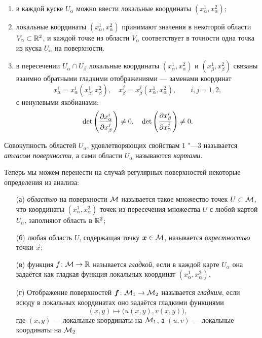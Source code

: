 \begin{enumerate}[nolistsep, label=(\arabic*)]
	\item в каждой куске $U_\alpha$ можно ввести локальные координаты $(x^1_\alpha, x^2_\alpha)$;
	\item локальные координаты $(x^1_\alpha, x^2_\alpha)$ принимают значения в некоторой области $V_\alpha \subset \mathbb{R}^2$, и каждой точке из области $V_\alpha$ соответствует в точности одна точка из куска $U_\alpha$ на поверхности.
	\item в пересечении $U_\alpha \cap U_\beta$ локальные координаты $(x^1_\alpha, x^2_\alpha)$ и $(x^1_\beta, x^2_\beta)$ связаны взаимно обратными гладкими отображениями --- заменами координат
		\[
			x^i_\alpha = x^i_\alpha(x^1_\beta, x^2_\beta),\quad x^j_\beta = x^j_\beta(x^1_\alpha, x^2_\alpha),\qquad i, j = 1, 2,
		\]
		с ненулевыми якобианами:
		\[
			\det\left(\frac{\partial x^i_\alpha}{\partial x^j_\beta}\right) \ne 0,\quad \det\left(\frac{\partial x^i_\beta}{\partial x^j_\alpha}\right) \ne 0.
		\]
\end{enumerate}

\begin{definition}
	Совокупность областей $U_\alpha$, удовлетворяющих свойствам $1$ "---$3$ называется \textit{атласом поверхности}, а сами области $U_\alpha$ называются \textit{картами}.
\end{definition}

Теперь мы можем перенести на случай регулярных поверхностей некоторые определения из анализа:

\begin{enumerate}[nolistsep]
	\item[(а)] \textit{областью} на поверхности $\mathcal{M}$ называется такое множество точек $U \subset \mathcal{M}$, что координаты $(x_\alpha^1, x_\alpha^2)$ точек из пересечения множества $U$ с любой картой $U_\alpha$, заполняют область в $\mathbb{R}^2$;
	\item[(б)] любая область $U$, содержащая точку $\boldsymbol{x} \in \mathcal{M}$, называется \textit{окрестностью} точки $\vec{x}$;
	\item[(в)] функция $f\colon \mathcal{M} \to \mathbb{R}$ называется \textit{гладкой}, если в каждой карте $U_\alpha$ она задаётся как гладкая функция локальных координат $(x_\alpha^1, x_\alpha^2)$.
	\item[(г)] Отображение поверхностей $\boldsymbol{f}\colon \mathcal{M}_1 \to \mathcal{M}_2$ называется \textit{гладким}, если всюду в локальных координатах оно задаётся гладкими функциями
		\[
			(x, y) \mapsto \big(u(x, y), v(x, y)\big),
		\]
		где $(x, y)$ --- локальные координаты на $\mathcal{M}_1$, а $(u, v)$ --- локальные координаты на $\mathcal{M}_2$
\end{enumerate}

